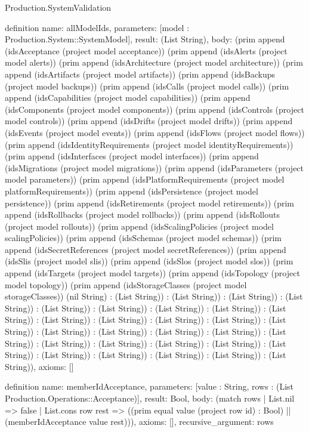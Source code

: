 \begin{lexlean}{Production.SystemValidation}
\begin{semanticmodule}
definition{
  name: allModelIds,
  parameters: [model : Production.System::SystemModel],
  result: (List String),
  body: (prim append (idsAcceptance (project model acceptance)) (prim append (idsAlerts (project model alerts)) (prim append (idsArchitecture (project model architecture)) (prim append (idsArtifacts (project model artifacts)) (prim append (idsBackups (project model backups)) (prim append (idsCalls (project model calls)) (prim append (idsCapabilities (project model capabilities)) (prim append (idsComponents (project model components)) (prim append (idsControls (project model controls)) (prim append (idsDrifts (project model drifts)) (prim append (idsEvents (project model events)) (prim append (idsFlows (project model flows)) (prim append (idsIdentityRequirements (project model identityRequirements)) (prim append (idsInterfaces (project model interfaces)) (prim append (idsMigrations (project model migrations)) (prim append (idsParameters (project model parameters)) (prim append (idsPlatformRequirements (project model platformRequirements)) (prim append (idsPersistence (project model persistence)) (prim append (idsRetirements (project model retirements)) (prim append (idsRollbacks (project model rollbacks)) (prim append (idsRollouts (project model rollouts)) (prim append (idsScalingPolicies (project model scalingPolicies)) (prim append (idsSchemas (project model schemas)) (prim append (idsSecretReferences (project model secretReferences)) (prim append (idsSlis (project model slis)) (prim append (idsSlos (project model slos)) (prim append (idsTargets (project model targets)) (prim append (idsTopology (project model topology)) (prim append (idsStorageClasses (project model storageClasses)) (nil String) : (List String)) : (List String)) : (List String)) : (List String)) : (List String)) : (List String)) : (List String)) : (List String)) : (List String)) : (List String)) : (List String)) : (List String)) : (List String)) : (List String)) : (List String)) : (List String)) : (List String)) : (List String)) : (List String)) : (List String)) : (List String)) : (List String)) : (List String)) : (List String)) : (List String)) : (List String)) : (List String)) : (List String)) : (List String)),
  axioms: []
}

definition{
  name: memberIdAcceptance,
  parameters: [value : String, rows : (List Production.Operations::Acceptance)],
  result: Bool,
  body: (match rows
    | List.nil => false
    | List.cons row rest => ((prim equal value (project row id) : Bool) || (memberIdAcceptance value rest))),
  axioms: [],
  recursive_argument: rows
}


\end{semanticmodule}
\end{lexlean}
